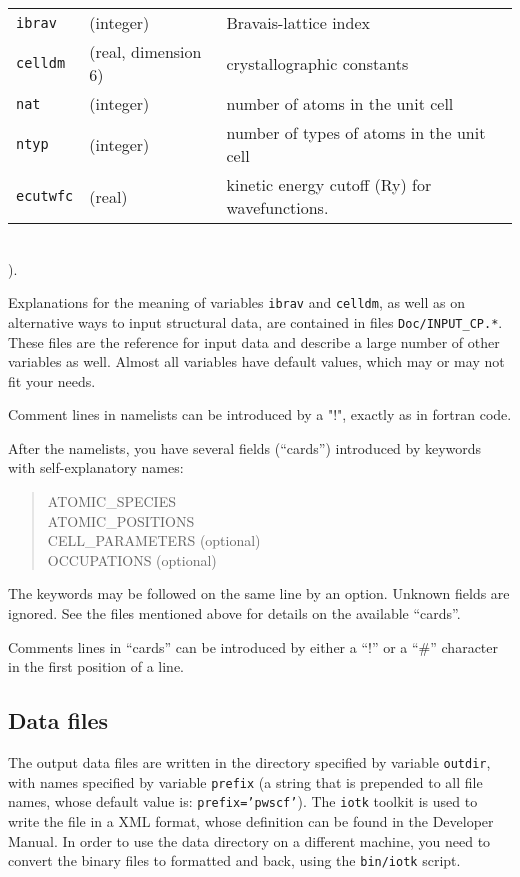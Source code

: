 \documentclass[12pt,a4paper]{article}
\begin{document}
\begin{tabular}{lll}
      \texttt{ibrav} & (integer)& Bravais-lattice index\\
      \texttt{celldm} &(real, dimension 6)& crystallographic constants\\
      \texttt{nat} &(integer)& number of atoms in the unit cell\\
      \texttt{ntyp} &(integer)& number of types of atoms in the unit cell\\
      \texttt{ecutwfc} &(real)& kinetic energy cutoff (Ry) for wavefunctions.
\end{tabular}    \\).
    
Explanations for the meaning of variables \texttt{ibrav} and \texttt{celldm},
as well as on alternative ways to input structural data,
are contained in files \texttt{Doc/INPUT\_CP.*}. These files are the reference for input data and describe 
a large number of other variables as well. Almost all variables have default 
values, which may or may not fit your needs.

Comment lines in namelists can be introduced by a "!", exactly as in 
fortran code. 

After the namelists, you have several fields (``cards'')
introduced by keywords with self-explanatory names:
\begin{quote}
       ATOMIC\_SPECIES\\
       ATOMIC\_POSITIONS\\
       CELL\_PARAMETERS (optional)\\
       OCCUPATIONS (optional)\\
\end{quote}
The keywords may be followed on the same line by an option. Unknown
fields are ignored. 
See the files mentioned above for details on the available ``cards''.

Comments lines in ``cards'' can be introduced by either a ``!'' or a ``\#''
character in the first position of a line.
 
\subsection{Data files}

The output data files are written in the directory specified by variable
\texttt{outdir}, with names specified by variable \texttt{prefix} (a string that is prepended
to all file names, whose default value is: \texttt{prefix='pwscf'}). The \texttt{iotk}
toolkit is used to write the file in a XML format, whose definition can
be found in the Developer Manual. In order to use the data directory
on a different machine, you need to convert the binary files to formatted
and back, using the \texttt{bin/iotk} script.
\end{document}
